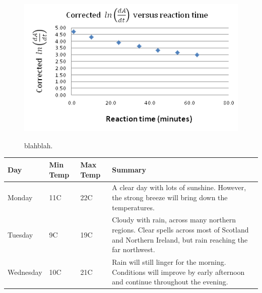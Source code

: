 \begin{figure}[h]
  \includegraphics[scale=0.5]{./Figures/016M_dipic_readings.png}\\
  \caption{blahblah.}\label{fig:0.016M_dipic_readings}
\end{figure}

\begin{center}
    \begin{tabular}{| l | l | l | l |}
    \hline
    Day & Min Temp & Max Temp & Summary \\ \hline
    Monday & 11C & 22C & A clear day with lots of sunshine.
    However, the strong breeze will bring down the temperatures. \\ \hline
    Tuesday & 9C & 19C & Cloudy with rain, across many northern regions. Clear spells
    across most of Scotland and Northern Ireland,
    but rain reaching the far northwest. \\ \hline
    Wednesday & 10C & 21C & Rain will still linger for the morning.
    Conditions will improve by early afternoon and continue
    throughout the evening. \\
    \hline
    \end{tabular}
\end{center}